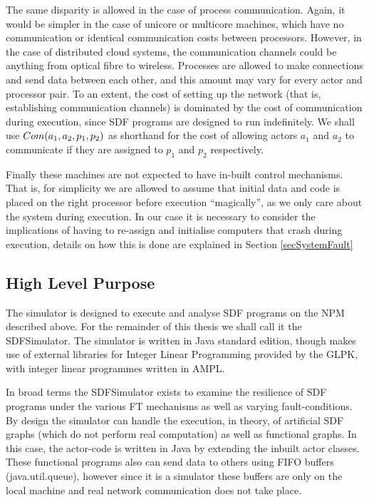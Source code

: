 The same disparity is allowed in the case of process communication.
Again, it would be simpler in the case of unicore or multicore machines, which have no communication or identical communication costs between processors.
However, in the case of distributed cloud systems, the communication channels could be anything from optical fibre to wireless.
Processes are allowed to make connections and send data between each other, and this amount may vary for every actor and processor pair.
To an extent, the cost of setting up the network (that is, establishing communication channels) is dominated by the cost of communication during execution, since SDF programs are designed to run indefinitely.
We shall use $Com(a_1, a_2, p_1, p_2)$ as shorthand for the cost of allowing actors $a_1$ and $a_2$ to communicate if they are assigned to $p_1$ and $p_2$ respectively.

Finally these machines are not expected to have in-built control mechanisms.
That is, for simplicity we are allowed to assume that initial data and code is placed on the right processor before execution ``magically'', as we only care about the system during execution.
In our case it is necessary to consider the implications of having to re-assign and initialise computers that crash during execution, details on how this is done are explained in Section \ref{secSystemFault}

\subsection{High Level Purpose}

The simulator is designed to execute and analyse SDF programs on the NPM described above.
For the remainder of this thesis we shall call it the SDFSimulator.
The simulator is written in Java standard edition, though makes use of external libraries for Integer Linear Programming provided by the GLPK, with integer linear programmes written in AMPL.

In broad terms the SDFSimulator exists to examine the resilience of SDF programs under the various FT mechanisms as well as varying fault-conditions.
By design the simulator can handle the execution, in theory, of artificial SDF graphs (which do not perform real computation) as well as functional graphs.
In this case, the actor-code is written in Java by extending the inbuilt actor classes.
These functional programs also can send data to others using FIFO buffers (java.util.queue), however since it is a simulator these buffers are only on the local machine and real network communication does not take place.

